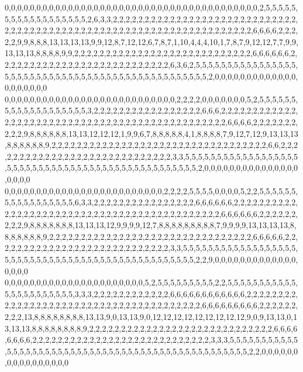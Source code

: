 0,0,0,0,0,0,0,0,0,0,0,0,0,0,0,0,0,0,0,0,0,0,0,0,0,0,0,0,0,0,0,0,0,0,0,0,0,0,0,0,2,5,5,5,5,5,5,5,5,5,5,5,5,5,5,5,5,5,5,2,6,3,3,2,2,2,2,2,2,2,2,2,2,2,2,2,2,2,2,2,2,2,2,2,2,2,2,2,2,2,2,2,2,2,2,2,2,2,2,2,2,2,2,2,2,2,2,2,2,2,2,2,2,2,2,2,2,2,2,2,2,2,2,2,2,2,2,2,2,2,2,6,6,6,6,2,2,2,2,2,9,9,8,8,8,13,13,13,13,9,9,12,8,7,12,12,6,7,8,7,1,10,4,4,4,10,1,7,8,7,9,12,12,7,7,9,9,13,13,13,8,8,8,8,9,9,2,2,2,2,2,2,2,2,2,2,2,2,2,2,2,2,2,2,2,2,2,2,2,2,2,2,2,2,6,6,6,6,6,6,2,2,2,2,2,2,2,2,2,2,2,2,2,2,2,2,2,2,2,2,2,2,2,2,2,2,2,6,3,6,2,5,5,5,5,5,5,5,5,5,5,5,5,5,5,5,5,5,5,5,5,5,5,5,5,5,5,5,5,5,5,5,5,5,5,5,5,5,5,5,5,5,5,5,5,5,5,5,5,2,0,0,0,0,0,0,0,0,0,0,0,0,0,0,0,0,0,0,0,0
0,0,0,0,0,0,0,0,0,0,0,0,0,0,0,0,0,0,0,0,0,0,0,0,0,0,0,2,2,2,2,0,0,0,0,0,0,0,5,2,5,5,5,5,5,5,5,5,5,5,5,5,5,5,5,5,5,5,5,3,2,2,2,2,2,2,2,2,2,2,2,2,2,2,2,2,2,6,6,6,2,2,2,2,2,2,2,2,2,2,2,2,2,2,2,2,2,2,2,2,2,2,2,2,2,2,2,2,2,2,2,2,2,2,2,2,2,2,2,2,2,2,2,2,2,2,2,6,6,6,6,2,2,2,2,2,2,2,2,2,2,9,8,8,8,8,8,8,13,13,12,12,12,1,9,9,6,7,8,8,8,8,8,4,1,8,8,8,8,7,9,12,7,12,9,13,13,13,8,8,8,8,8,8,9,2,2,2,2,2,2,2,2,2,2,2,2,2,2,2,2,2,2,2,2,2,2,2,2,2,2,2,2,2,2,2,2,2,2,6,6,2,2,2,2,2,2,2,2,2,2,2,2,2,2,2,2,2,2,2,2,2,2,2,2,2,2,2,2,2,3,3,5,5,5,5,5,5,5,5,5,5,5,5,5,5,5,5,5,5,5,5,5,5,5,5,5,5,5,5,5,5,5,5,5,5,5,5,5,5,5,5,5,5,5,5,5,5,5,5,2,0,0,0,0,0,0,0,0,0,0,0,0,0,0,0,0,0,0,0
0,0,0,0,0,0,0,0,0,0,0,0,0,0,0,0,0,0,0,0,0,0,0,0,0,2,2,2,2,5,5,5,5,0,0,0,0,5,2,2,5,5,5,5,5,5,5,5,5,5,5,5,5,5,5,5,5,6,3,3,2,2,2,2,2,2,2,2,2,2,2,2,2,2,2,2,6,6,6,6,6,6,2,2,2,2,2,2,2,2,2,2,2,2,2,2,2,2,2,2,2,2,2,2,2,2,2,2,2,2,2,2,2,2,2,2,2,2,2,2,2,2,2,2,2,2,6,6,6,6,6,6,2,2,2,2,2,2,2,2,2,9,8,8,8,8,8,8,8,13,13,13,12,9,9,9,9,12,7,8,8,8,8,8,8,8,8,8,7,9,9,9,9,13,13,13,13,8,8,8,8,8,8,8,9,2,2,2,2,2,2,2,2,2,2,2,2,2,2,2,2,2,2,2,2,2,2,2,2,2,2,2,2,2,2,2,2,6,6,6,6,6,2,2,2,2,2,2,2,2,2,2,2,2,2,2,2,2,2,2,2,2,2,2,2,2,2,2,2,2,3,3,5,5,5,5,5,5,5,5,5,5,5,5,5,5,5,5,5,5,5,5,5,5,5,5,5,5,5,5,5,5,5,5,5,5,5,5,5,5,5,5,5,5,5,5,5,5,5,5,2,2,9,0,0,0,0,0,0,0,0,0,0,0,0,0,0,0,0,0
0,0,0,0,0,0,0,0,0,0,0,0,0,0,0,0,0,0,0,0,0,0,5,2,5,5,5,5,5,5,5,5,5,2,2,5,5,5,5,5,5,5,5,5,5,5,5,5,5,5,5,5,5,5,5,5,5,3,3,3,2,2,2,2,2,2,2,2,2,2,2,2,6,6,6,6,6,6,6,6,6,6,6,6,2,2,2,2,2,2,2,2,2,2,2,2,2,2,2,2,2,2,2,2,2,2,2,2,2,2,2,2,2,2,2,2,2,2,2,2,2,2,2,6,6,6,6,6,6,6,6,6,2,2,2,2,2,2,2,2,2,13,8,8,8,8,8,8,8,8,13,13,9,0,13,13,9,0,12,12,12,12,12,12,12,12,12,9,0,9,13,13,0,13,13,13,8,8,8,8,8,8,8,8,9,2,2,2,2,2,2,2,2,2,2,2,2,2,2,2,2,2,2,2,2,2,2,2,2,2,2,2,2,2,6,6,6,6,6,6,6,6,2,2,2,2,2,2,2,2,2,2,2,2,2,2,2,2,2,2,2,2,2,2,2,2,2,2,2,2,3,3,3,5,5,5,5,5,5,5,5,5,5,5,5,5,5,5,5,5,5,5,5,5,5,5,5,5,5,5,5,5,5,5,5,5,5,5,5,5,5,5,5,5,5,5,5,5,5,5,5,5,2,2,0,0,0,0,0,0,0,0,0,0,0,0,0,0,0,0
